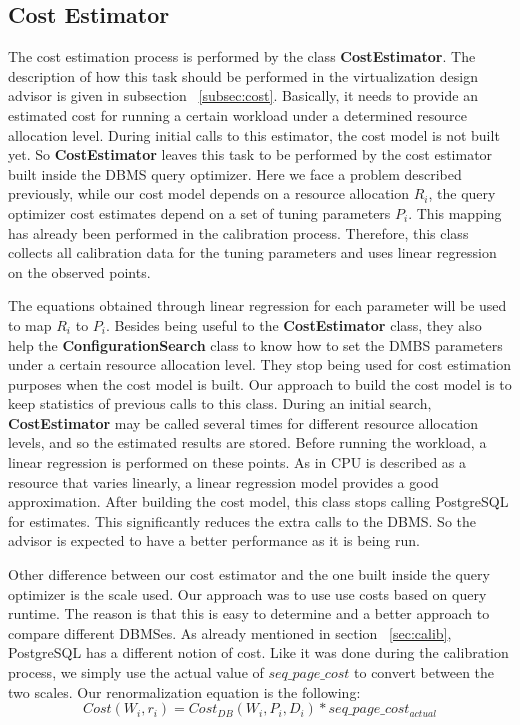 \subsection{Cost Estimator}

The cost estimation process is performed by the class \textbf{CostEstimator}. The description of how this task should be performed in the virtualization design advisor is given in subsection ~\ref{subsec:cost}. Basically, it needs to provide an estimated cost for running a certain workload under a determined resource allocation level. During initial calls to this estimator, the cost model is not built yet. So \textbf{CostEstimator} leaves this task to be performed by the cost estimator built inside the DBMS query optimizer. Here we face a problem described previously, while our cost model depends on a resource allocation $R_{i}$, the query optimizer cost estimates depend on a set of tuning parameters $P_{i}$. This mapping has already been performed in the calibration process. Therefore, this class collects all calibration data for the tuning parameters and uses linear regression on the observed points. 

The equations obtained through linear regression for each parameter will be used to map $R_{i}$ to $P_{i}$. Besides being useful to the \textbf{CostEstimator} class, they also help the \textbf{ConfigurationSearch} class to know how to set the DMBS parameters under a certain resource allocation level. They stop being used for cost estimation purposes when the cost model is built. Our approach to build the cost model is to keep statistics of previous calls to this class. During an initial search, \textbf{CostEstimator} may be called several times for different resource allocation levels, and so the estimated results are stored. Before running the workload, a linear regression is performed on these points. As in \cite{Soror:2008:AVM:1376616.1376711} CPU is described as a resource that varies linearly, a linear regression model provides a good approximation. After building the cost model, this class stops calling PostgreSQL for estimates. This significantly reduces the extra calls to the DBMS. So the advisor is 
expected to have a better performance as it is being run.

Other difference between our cost estimator and the one built inside the query optimizer is the scale used. Our approach was to use use costs based on query runtime. The reason is that this is easy to determine and a better approach to compare different DBMSes. As already mentioned in section ~\ref{sec:calib}, PostgreSQL has a different notion of cost. Like it was done during the calibration process, we simply use the actual value of $seq\_page\_cost$ to convert between the two scales. Our renormalization equation is the following:
\[
 Cost(W_{i}, r_{i}) = Cost_{DB}(W_{i},P_{i},D_{i}) * seq\_page\_cost_{actual}
\]

